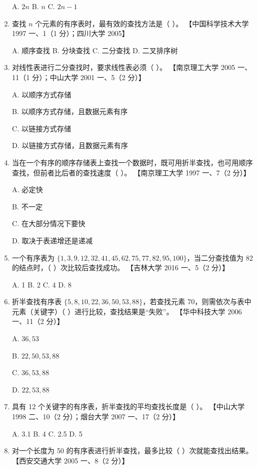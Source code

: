 \documentclass[lang=cn,newtx,10pt,scheme=chinese]{../../elegantbook}
\begin{document}
\begin{enumerate}
    A. $2n$ \quad B. $n$ \quad C. $2n-1$

    \item 查找 $n$ 个元素的有序表时，最有效的查找方法是（ ）。  
    【中国科学技术大学 1997 一、1（1 分）；四川大学 2005】  

    A. 顺序查找 \quad B. 分块查找 \quad C. 二分查找 \quad D. 二叉排序树  

    \item 对线性表进行二分查找时，要求线性表必须（ ）。  
    【南京理工大学 2005 一、11（1 分）；中山大学 2001 一、5（2 分）】  

    A. 以顺序方式存储  

    B. 以顺序方式存储，且数据元素有序  

    C. 以链接方式存储  

    D. 以链接方式存储，且数据元素有序  

    \item 当在一个有序的顺序存储表上查找一个数据时，既可用折半查找，也可用顺序查找，但前者比后者的查找速度（ ）。  
    【南京理工大学 1997 一、7（2 分）】  

    A. 必定快  

    B. 不一定  

    C. 在大部分情况下要快  

    D. 取决于表递增还是递减  

    \item 一个有序表为 $\{1, 3, 9, 12, 32, 41, 45, 62, 75, 77, 82, 95, 100\}$，当二分查找值为 82 的结点时，（ ）次比较后查找成功。  
    【吉林大学 2016 一、5（2 分）】  

    A. 1 \quad B. 2 \quad C. 4 \quad D. 8  

    \item 折半查找有序表 $\{5, 8, 10, 22, 36, 50, 53, 88\}$，若查找元素 70，则需依次与表中元素（关键字）（ ）进行比较，查找结果是“失败”。  
    【华中科技大学 2006 一、11（2 分）】  

    A. $36, 53$  

    B. $22, 50, 53, 88$  

    C. $36, 53, 88$  

    D. $22, 53, 88$  

    \item 具有 12 个关键字的有序表，折半查找的平均查找长度是（ ）。  
    【中山大学 1998 二、10（2 分）；烟台大学 2007 一、17（2 分）】  

    A. 3.1 \quad B. 4 \quad C. 2.5 \quad D. 5  

    \item 对一个长度为 50 的有序表进行折半查找，最多比较（ ）次就能查找出结果。  
    【西安交通大学 2005 一、8（2 分）】  


\end{enumerate}
\end{document}
